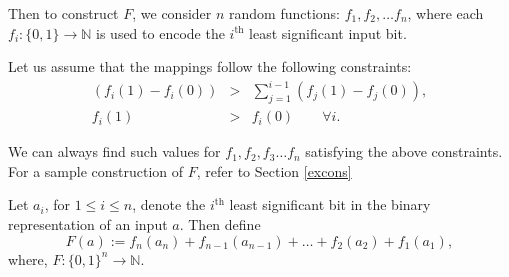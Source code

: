 \documentclass[11pt, letterpaper, romanappendices, onecolumn]{article}
\theoremstyle{plain}\newtheorem{thm}{Theorem}[section]
\theoremstyle{definition}
\theoremstyle{remark}
\begin{document}
\par Then to construct $F$, we consider $n$ random functions: $f_1, f_2, \ldots f_n$, where each $f_i: \lbrace 0,1\rbrace \rightarrow\mathbb{N}$ is used to encode the $i^\text{th}$ least significant input bit.

Let us assume that the mappings follow the following constraints:
\begin{eqnarray}
(f_i(1)- f_i(0)) &>& \displaystyle\sum\limits^{i-1}_{j=1} (f_j(1) - f_j(0)),\\
f_i(1) &>& f_i(0) \qquad \forall i.
\end{eqnarray}

\par We can always find such values for $f_1, f_2, f_3 \ldots f_n$ satisfying the above constraints. For a sample construction of $F$, refer to Section \ref{excons}
\par Let $a_i$, for $1 \le i \le n$, denote the $i^\text{th}$ least significant bit in the binary representation of an input $a$. Then define
\begin{equation}
F(a) := f_n(a_n) + f_{n-1}(a_{n-1}) + \ldots + f_2(a_2) + f_1(a_1),
\end{equation}
where, $F:\lbrace 0,1 \rbrace^n \rightarrow\mathbb{N}$.
\end{document}
